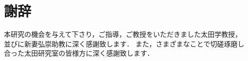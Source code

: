 \chapter*{謝辞}

本研究の機会を与えて下さり，ご指導，ご教授をいただきました太田学教授，
並びに新妻弘崇助教に深く感謝致します．
また，さまざまなことで切磋琢磨し合った太田研究室の皆様方に深く感謝致します．

